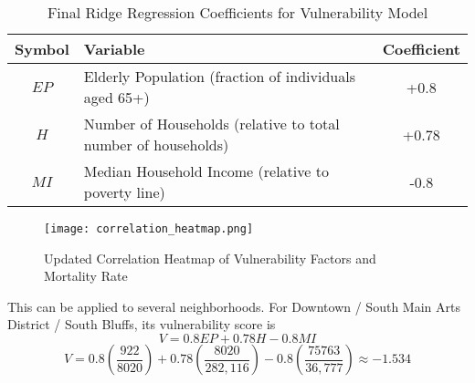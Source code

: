 \documentclass{article}
\begin{document}
\begin{table}[h]
    \centering
    \begin{tabular}{|c|l|c|}
        \hline
        \textbf{Symbol} & \textbf{Variable} & \textbf{Coefficient} \\ 
        \hline
        $EP$ & Elderly Population (fraction of individuals aged 65+) & +0.8\\ 
        \hline
        $H$ & Number of Households (relative to total number of households) & +0.78\\ 
        \hline
        $MI$ & Median Household Income (relative to poverty line) & -0.8 \\
        \hline
    \end{tabular}
    \caption{Final Ridge Regression Coefficients for Vulnerability Model}
    \label{tab:coefficients}
\end{table}
\begin{figure}[h]
    \centering
    \texttt{[image: correlation\_heatmap.png]}  %
    \caption{Updated Correlation Heatmap of Vulnerability Factors and Mortality Rate}
    \label{fig:correlation_heatmap}
\end{figure}
This can be applied to several neighborhoods. For Downtown / South Main Arts District / South Bluffs, its vulnerability score is 
\[ V = 0.8EP + 0.78H - 0.8MI\]
\[ V = 0.8\left(\frac{922}{8020}\right) + 0.78\left( \frac{8020}{282,116} \right) -0.8\left( \frac{75763}{36,777}\right) \approx -1.534\]
\end{document}

